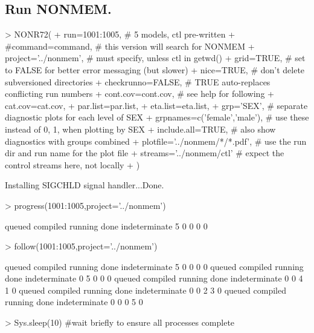 \subsection{Run NONMEM.}
\begin{Schunk}
\begin{Sinput}
> NONR72(
+      run=1001:1005,                       # 5 models, ctl pre-written
+      #command=command,                    # this version will search for NONMEM
+      project='../nonmem',                 # must specify, unless ctl in getwd()
+      grid=TRUE,                          # set to FALSE for better error messaging (but slower)
+      nice=TRUE,                           # don't delete subversioned directories
+      checkrunno=FALSE,                    # TRUE auto-replaces conflicting run numbers
+      cont.cov=cont.cov,                   # see help for following
+      cat.cov=cat.cov,
+      par.list=par.list,
+      eta.list=eta.list,
+      grp='SEX',                           # separate diagnostic plots for each level of SEX
+      grpnames=c('female','male'),         # use these instead of 0, 1, when plotting by SEX
+      include.all=TRUE,                    # also show diagnostics with groups combined
+      plotfile='../nonmem/*/*.pdf',        # use the run dir and run name for the plot file 
+      streams='../nonmem/ctl'              # expect the control streams here, not locally
+ )
\end{Sinput}
\begin{Soutput}
Installing SIGCHLD signal handler...Done.
\end{Soutput}
\begin{Sinput}
> progress(1001:1005,project='../nonmem')
\end{Sinput}
\begin{Soutput}
       queued      compiled       running          done indeterminate 
            5             0             0             0             0 
\end{Soutput}
\begin{Sinput}
> follow(1001:1005,project='../nonmem')
\end{Sinput}
\begin{Soutput}
       queued      compiled       running          done indeterminate 
            5             0             0             0             0 
       queued      compiled       running          done indeterminate 
            0             5             0             0             0 
       queued      compiled       running          done indeterminate 
            0             0             4             1             0 
       queued      compiled       running          done indeterminate 
            0             0             2             3             0 
       queued      compiled       running          done indeterminate 
            0             0             0             5             0 
\end{Soutput}
\begin{Sinput}
> Sys.sleep(10)                             #wait briefly to ensure all processes complete
\end{Sinput}
\end{Schunk}
